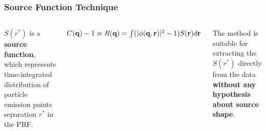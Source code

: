 \documentclass[dvipsnames] {beamer}
\begin{document}
\begin{frame}[shrink=10]
  \frametitle{Source Function Technique}
  \begin{columns}
    \begin{block}{}
      $S(r^{*})$ is a {\bf source function}, which represents time-integrated distribution of particle emission points separation
      $r^{*}$ in the PRF.
    \end{block}
     \begin{block}{}
       $C({\bf q}) - 1 \equiv R({\bf q}) = \int (|\phi({\bf q, r})|^{2} - 1) S({\bf r}) d{\bf r}$
     \end{block}
      \begin{block}{}
        The method is suitable for extracting the $S(r^{*})$ directly from the data {\bf {\color{red}without any hypothesis about source shape}}.
       

\end{block}
\end{columns}
\end{frame}
\end{document}

